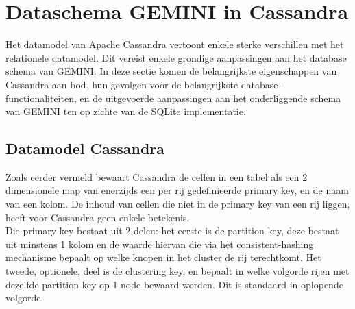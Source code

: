 \section{Dataschema GEMINI in Cassandra}
\label{cassandra_datamodel}

Het datamodel van Apache Cassandra vertoont enkele sterke verschillen met het relationele datamodel. Dit vereist enkele grondige aanpassingen aan het database schema van GEMINI. In deze sectie komen de belangrijkste eigenschappen van Cassandra aan bod, hun gevolgen voor de belangrijkste database-functionaliteiten, en de uitgevoerde aanpassingen aan het onderliggende schema van GEMINI ten op zichte van de SQLite implementatie.

\subsection{Datamodel Cassandra}

Zoals eerder vermeld bewaart Cassandra de cellen in een tabel als een 2 dimensionele map van enerzijds een per rij gedefinieerde primary key, en de naam van een kolom. De inhoud van cellen die niet in de primary key van een rij liggen, heeft voor Cassandra geen enkele betekenis.\\
Die primary key bestaat uit 2 delen: het eerste is de partition key, deze bestaat uit minstens 1 kolom en de waarde hiervan die via het consistent-hashing mechanisme bepaalt op welke knopen in het cluster de rij terechtkomt. Het tweede, optionele, deel is de clustering key, en bepaalt in welke volgorde rijen met dezelfde partition key op 1 node bewaard worden. Dit is standaard in oplopende volgorde.\\\\

